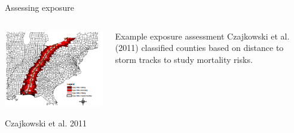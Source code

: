\documentclass[ignorenonframetext,]{beamer}
\begin{document}
\begin{frame}{Assessing exposure}

\begin{columns}
\begin{column}{0.7\textwidth}

\begin{center}\includegraphics[width=\textwidth]{coastal_inland_mortality_figure} \end{center}
\vspace{-0.5cm}
\begin{center}
\footnotesize Czajkowski et al. 2011
\end{center}
\end{column}
\begin{column}{0.3\textwidth}
\small
\begin{block}{Example exposure assessment}
Czajkowski et al. (2011) classified counties based on distance to storm tracks to study mortality risks.
\end{block}
\end{column}
\end{columns}

\end{frame}
\end{document}
